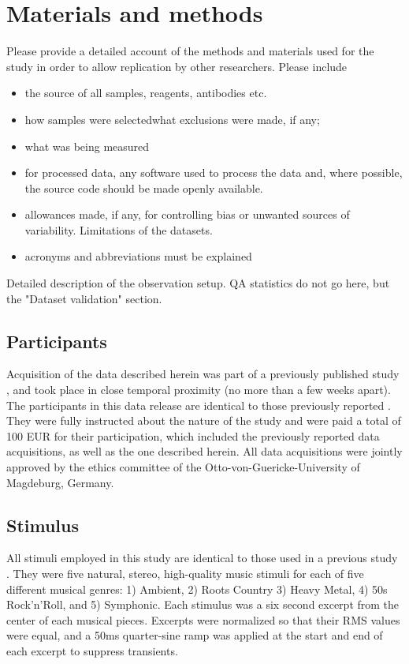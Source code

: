 \section*{Materials and methods} 
Please provide a detailed account of the methods and materials used for the study in order to allow replication by other researchers.
Please include \begin{itemize}
\item 
the source of all samples, reagents, antibodies etc.
\item 
 how samples were selectedwhat exclusions were made, if any;
\item 
what was being measured
\item 
for processed data, any software used to process the data and, where possible, the source code should be made openly available.\item 

allowances made, if any, for controlling bias or unwanted sources of variability.
Limitations of the datasets.\item 

acronyms and abbreviations must be explained
\end{itemize}

Detailed description of the observation setup. QA statistics do not go here, but the "Dataset validation" section.

\subsection*{Participants}

Acquisition of the data described herein was part of a previously published
study \cite{Hanke_2014}, and took place in close temporal proximity (no more
than a few weeks apart). The participants in this data release are identical to
those previously reported \cite{Hanke_2014}.  They were fully instructed about
the nature of the study and were paid a total of 100 EUR for their
participation, which included the previously reported data acquisitions, as
well as the one described herein. All data acquisitions were jointly approved
by the ethics committee of the Otto-von-Guericke-University of Magdeburg,
Germany.


\subsection*{Stimulus}

All stimuli employed in this study are identical to those used in a previous
study \cite[for details refer to][]{Casey_2012}. They were five natural,
stereo, high-quality music stimuli for each of five different musical genres:
1) Ambient, 2) Roots Country 3) Heavy Metal, 4) 50s Rock'n'Roll, and 5)
Symphonic.  Each stimulus was a six second excerpt from the center of each
musical pieces.  Excerpts were normalized so that their RMS values were equal,
and a 50ms quarter-sine ramp was applied at the start and end of each excerpt
to suppress transients.

